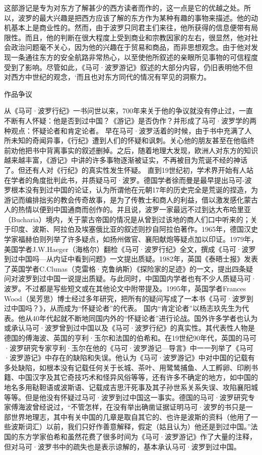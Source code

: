 \documentclass[12pt,UTF8]{ctexbook}
\begin{document}
这部游记是专为对东方了解甚少的西方读者而作的，这一点是它的优越之处。所以，波罗的最大兴趣是把西方应该了解的东方作为某种有趣的事物来描述。他的动机基本上是商业性的。然而，由于波罗只同君主们来往，他所获得的信息便带有局限性。而且，他的判断在很大程度上受到商业和宗教因家的左右，很显然，他对社会政治问题毫不关心，因为他的兴趣在于贸易和商品，而非思想观念。由于他对发现一条通往东方的安全航路非常热心，以至使他所叙述的亲眼所见事物的可信程度受到了影响。尽管如此，《马可·波罗游记》叙述的大部分内容，仍旧表明他不但对西方中世纪的观念，‘而且也对东方同代的情况有罕见的洞察力。

作品争议

从《马可·波罗行纪》一书问世以来，700年来关于他的争议就没有停止过，一直不断有人怀疑：他是否到过中国？《游记》是否伪作？并形成了马可·波罗学的两种观点：怀疑论者和肯定论者。
早在马可·波罗活着的时候，由于书中充满了人所未知的奇闻异事，《行纪》遭到人们的怀疑和讽刺。关心他的朋友甚至在他临终前劝他把书中背离事实的叙述删掉。之后，随着地理大发现，欧洲人对东方的知识越来越丰富，《游记》中讲的许多事物逐渐被证实，不再被目为荒诞不经的神话了。但还有人对《行纪》的真实性发生怀疑。
直到19世纪初，学术界开始有人站在学者的角度批判此书，并质疑马可·波罗。德国学者徐而曼是最早提出马可-波罗根本没有到过中国的论证，认为所谓他在元朝17年的历史完全是荒诞的捏造，为游记而编排拙劣的教会传奇故事，是为了传教士和商人的利益，借以激发感化蒙古人的热情以便到中国通商而创作的。并且说，波罗一家最远不过到达大布哈里亚（Bucharia）境内，关于蒙古帝国的情况是从曾到过该地的商人们口中听来的；关于印度、波斯、阿拉伯及埃塞俄比亚的叙述则抄自阿拉伯著作。1965年，德国汉史学家福赫伯则列举了许多疑点，如扬州做官、襄阳献炮等疑点加以印证。1979年，美国学者J.W.Haeger（海格尔）翻检《马可·波罗行纪》全文，撰成《马可·波罗到过中国吗—从内证中看到问题》一文提出质疑。1982年，英国《泰晤士报》发表了英国学者C.Clunas（克雷格·克鲁纳斯）《探险家的足迹》的一文，提出四条疑问对波罗到过中国一说提出质疑。与此同时，中国国内学者也有不少人质疑马可·波罗。不过都是写些短文或在其他论文中附带提及。1995年，英国学者Frances Wood（吴芳思）博士经过多年研究，把所有的疑问写成了一本书《马可·波罗到过中国吗？》，从而成为“怀疑论者”的代表。
国内“肯定论者”以杨志玖先生为代表。他从40年代起就不断地同国内外的“怀疑论者”进行论战。国外许多学者也认为或承认马可·波罗曾到过中国以及《马可·波罗行纪》的真实性。其代表性人物是德国的傅海波、英国的亨利·玉尔和法国的伯希和。在19世纪90年代，英国的马可·波罗研究专家亨利·玉尔在他的《马可·波罗游记—导言》中一一列举了《马可·波罗游记》中存在的缺陷和失误。他认为《马可·波罗游记》中对中国的记载有多处缺陷，如根本没有记载任何关于长城、茶叶、用鹭鸶捕鱼、人工孵卵、印刷书籍、中国汉字及其它奇技巧术和怪异风俗等等，还有许多不确定的地方，如中国的地名多用鞑靼语或波斯语、记载成吉思汗死事及其子孙世系关系失误、攻陷襄阳城等等。但是他没有怀疑过马可·波罗到过中国这一事实。德国的马可·波罗研究专家傅海波曾经说过，“不管怎样，在没有举出确凿证据证明马可·波罗的书只是一部世界地理志，其中有关中国的几章是取自其它的、也许是波斯的资料（他用了一些波斯词汇）以前，我们只好作善意解释，假定（姑且认为）他还是到过中国。”法国的东方学家伯希和虽然花费了很多时间为《马可·波罗游记》作了大量的注释，但对马可·波罗书中的疏失也是表示谅解的，基本承认马可·波罗到过中国。
\end{document}
